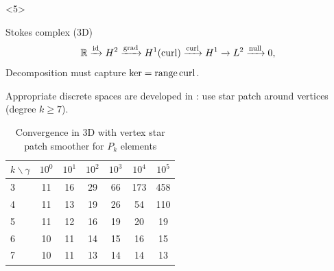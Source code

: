 \documentclass[presentation,aspectratio=43, 10pt]{beamer}
\DeclareMathOperator{\grad}{grad}
\let\div\relax
\DeclareMathOperator{\div}{div}
\DeclareMathOperator{\curl}{curl}
\DeclareMathOperator{\range}{range}
\begin{document}
\begin{frame}[fragile,t]
\begin{onlyenv}
\begin{onlyenv}
    \end{onlyenv}
  \end{onlyenv}
  \begin{onlyenv}<5>
      \begin{block}{Stokes complex (3D)}
        \begin{equation*}
          \mathbb{R} \xrightarrow{\operatorname{id}} H^2
          \xrightarrow{\grad} H^1(\curl) \xrightarrow{\curl} H^1 \xrightarrow{\div} L^2 \xrightarrow{\operatorname{null}} 0,
        \end{equation*}
        Decomposition must capture $\ker \div = \range \curl$.

        Appropriate discrete spaces are developed in \textcite{Neilan:2015}: use
        star patch around vertices (degree $k \ge 7$).
      \end{block}
    \begin{table}
      \centering
      {\footnotesize
      \begin{tabular}{l|cccccc}
        $k\backslash \gamma$ & $10^0$ & $10^1$ & $10^2$ & $10^3$ & $10^4$ & $10^5$ \\
        \toprule
        3                    & 11     & 16     & 29     & 66     & 173    & 458    \\
        4                    & 11     & 13     & 19     & 26     & 54
                                                                          & 110    \\
        \midrule
        5                    & 11     & 12     & 16     & 19     & 20     & 19     \\
        6                    & 10     & 11     & 14     & 15     & 16
                                                                          & 15     \\
        \midrule
        7                    & 10     & 11     & 13     & 14     & 14     & 13     \\
      \end{tabular}
      \caption{Convergence in 3D with vertex star patch smoother for
        $P_k$ elements}
      }
    \end{table}
  \end{onlyenv}
\end{frame}
\end{document}

